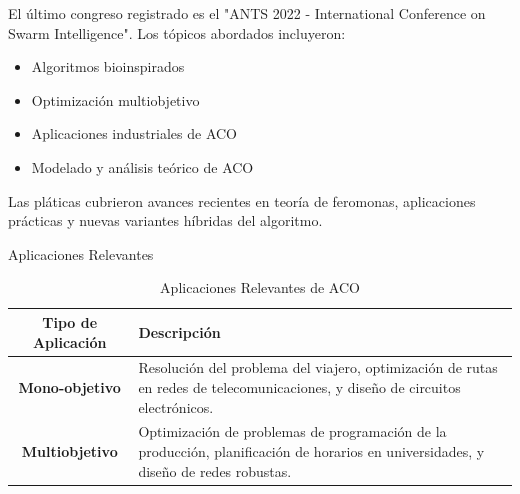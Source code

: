 \documentclass{report}
\begin{document}
El último congreso registrado es el "ANTS 2022 - International Conference on Swarm Intelligence". Los tópicos abordados incluyeron:

\begin{itemize}
    \item Algoritmos bioinspirados
    \item Optimización multiobjetivo
    \item Aplicaciones industriales de ACO
    \item Modelado y análisis teórico de ACO
\end{itemize}

Las pláticas cubrieron avances recientes en teoría de feromonas, aplicaciones prácticas y nuevas variantes híbridas del algoritmo.

Aplicaciones Relevantes

\begin{table}[H]
\centering
\begin{tabular}{|c|p{10cm}|}
\hline
\textbf{Tipo de Aplicación} & \textbf{Descripción} \\
\hline
\textbf{Mono-objetivo} & Resolución del problema del viajero, optimización de rutas en redes de telecomunicaciones, y diseño de circuitos electrónicos. \\
\hline
\textbf{Multiobjetivo} & Optimización de problemas de programación de la producción, planificación de horarios en universidades, y diseño de redes robustas. \\
\hline
\end{tabular}
\caption{Aplicaciones Relevantes de ACO}
\end{table}
\end{document}
